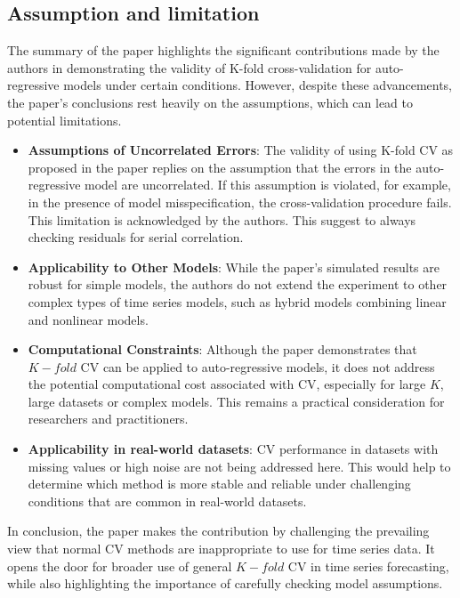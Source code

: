 \documentclass[12pt, oneside]{amsart}
\theoremstyle{definition}
\theoremstyle{remark}
\numberwithin{equation}{section}
\begin{document}
\subsection{Assumption and limitation} 
The summary of the paper highlights the significant contributions made by the authors in demonstrating the validity of K-fold cross-validation for auto-regressive models under certain conditions. However, despite these advancements, the paper's conclusions rest heavily on the assumptions, which can lead to potential limitations.
\begin{itemize}
    \item \textbf{Assumptions of Uncorrelated Errors}: The validity of using K-fold CV as proposed in the paper replies on the assumption that the errors in the auto-regressive model are uncorrelated. If this assumption is violated, for example, in the presence of model misspecification, the cross-validation procedure fails. This limitation is acknowledged by the authors. This suggest to always checking residuals for serial correlation. 
    \item \textbf{Applicability to Other Models}: While the paper's simulated results are robust for simple models, the authors do not extend the experiment to other complex types of time series models, such as hybrid models combining linear and nonlinear models. 
    \item \textbf{Computational Constraints}: Although the paper demonstrates that $K-fold$ CV can be applied to auto-regressive models, it does not address the potential computational cost associated with CV, especially for large $K$, large datasets or complex models. This remains a practical consideration for researchers and practitioners.
    \item \textbf{Applicability in real-world datasets}: CV performance in datasets with missing values or high noise are not being addressed here. This would help to determine which method is more stable and reliable under challenging conditions that are common in real-world datasets.
\end{itemize}

In conclusion, the paper makes the contribution by challenging the prevailing view that normal CV methods are inappropriate to use for time series data. It opens the door for broader use of general $K-fold$ CV in time series forecasting, while also highlighting the importance of carefully checking model assumptions.

\end{document}
